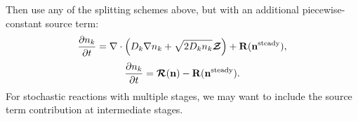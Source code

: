 \documentclass[final]{siamltex}
\def\nb  {{\bf n}}
\def\Rb  {{\bf R}}
\def\mRb {\bm{\mathcal{R}}}
\def\mZb {\bm{\mathcal{Z}}}
\begin{document}
Then use any of the splitting schemes above, but with an additional piecewise-constant
source term:
\begin{equation}
\frac{\partial n_k}{\partial t} = \nabla\cdot\left(D_k\nabla n_k + \sqrt{2D_kn_k}\mZb\right) + \Rb(\nb^{\rm steady}),\label{eq:Diffusion_bc}
\end{equation}
\begin{equation}
\frac{\partial n_k}{\partial t} = \mRb(\nb) - \Rb(\nb^{\rm steady}).\label{eq:Reactions_bc}
\end{equation}
For stochastic reactions with multiple stages, we may want to include the source 
term contribution at intermediate stages.



\end{document}
